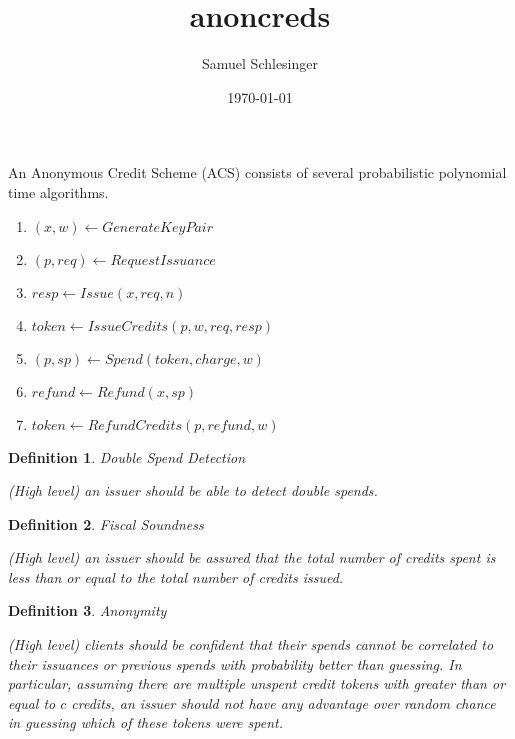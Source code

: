 \documentclass{article}
\title{anoncreds}
\author{Samuel Schlesinger}
\date{\today}
\newtheorem{definition}{Definition}
\begin{document}
\maketitle

An Anonymous Credit Scheme (ACS) consists of several probabilistic polynomial time algorithms. 

\begin{enumerate}
    \item $(x, w) \leftarrow GenerateKeyPair$
    \item $(p, req) \leftarrow RequestIssuance$
    \item $resp \leftarrow Issue(x, req, n)$
    \item $token \leftarrow IssueCredits(p, w, req, resp)$
    \item $(p, sp) \leftarrow Spend(token, charge, w)$
    \item $refund \leftarrow Refund(x, sp)$
    \item $token \leftarrow RefundCredits(p, refund, w)$
\end{enumerate}

\begin{definition}{Double Spend Detection}

    (High level) an issuer should be able to detect double spends.
\end{definition}

\begin{definition}{Fiscal Soundness}

    (High level) an issuer should be assured that the total number of credits spent is less than or equal to the total number of credits issued.
\end{definition}

\begin{definition}{Anonymity}

    (High level) clients should be confident that their spends cannot be correlated to their issuances or previous spends with probability better than guessing. In particular, assuming there are multiple unspent credit tokens with greater than or equal to $c$ credits, an issuer should not have any advantage over random chance in guessing which of these tokens were spent.
\end{definition}
\end{document}
